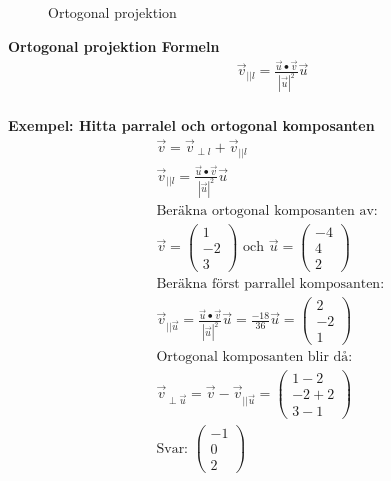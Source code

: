 \begin{multicols}{2}
\begin{figure}[H]
  \centering
  
  \caption{Ortogonal projektion}
\end{figure}

\textbf{Ortogonal projektion Formeln}
\begin{align*} 
  &\quad  \vec{v}_{||{l}} = \frac{\vec{u}\bullet{\vec{v}}}{|\vec{u}|^2}\vec{u}  \\
\end{align*}

\textbf{Exempel: Hitta parralel och ortogonal komposanten}
\begin{align*} 
  &\quad  \vec{v} = \vec{v}_{\perp{l}} + \vec{v}_{||{l}} \\
  &\quad  \vec{v}_{||{l}} = \frac{\vec{u}\bullet{\vec{v}}}{|\vec{u}|^2}\vec{u}  \\
  &\quad  \text{Beräkna ortogonal komposanten av: } \\
  &\quad
  \vec{v} = \begin{pmatrix} 1 \\ -2 \\ 3 \end{pmatrix} \text{ och }
  \vec{u} = \begin{pmatrix} -4 \\ 4 \\ 2 \end{pmatrix} \\
  &\quad  \text{Beräkna först parrallel komposanten: } \\
  &\quad  \vec{v}_{||{\vec{u}}} = \frac{\vec{u}\bullet{\vec{v}}}{|\vec{u}|^2}\vec{u} = \frac{-18}{36}\vec{u}
  = \begin{pmatrix} 2 \\ -2 \\ 1 \end{pmatrix} \\
  &\quad  \text{Ortogonal komposanten blir då: } \\
  &\quad  \vec{v}_{\perp{\vec{u}}} = \vec{v} - \vec{v}_{||{\vec{u}}}
  = \begin{pmatrix} 1-2 \\ -2+2 \\ 3-1 \end{pmatrix} \\
  &\quad  \text{Svar: } \begin{pmatrix} -1 \\ 0 \\ 2 \end{pmatrix}
\end{align*}


\end{multicols}

